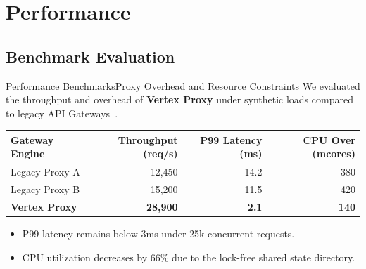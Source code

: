 \section{Performance}
\subsection{Benchmark Evaluation}

\begin{frame}{Performance Benchmarks}{Proxy Overhead and Resource Constraints}
  We evaluated the throughput and overhead of \textbf{Vertex Proxy} under synthetic loads compared to legacy API Gateways~\cite{jenkins2025synapse}.
  
  \vspace{0.3cm}
  \centering
  \begin{tabular}{lrrr}
    \toprule
    \textbf{Gateway Engine} & \textbf{Throughput (req/s)} & \textbf{P99 Latency (ms)} & \textbf{CPU Over (mcores)} \\
    \midrule
    Legacy Proxy A          & 12,450                      & 14.2                      & 380                        \\
    Legacy Proxy B          & 15,200                      & 11.5                      & 420                        \\
    \textbf{Vertex Proxy}   & \textbf{28,900}             & \textbf{2.1}              & \textbf{140}               \\
    \bottomrule
  \end{tabular}
  
  \vspace{0.4cm}
  \begin{itemize}
    \item P99 latency remains below 3ms under 25k concurrent requests.
    \item CPU utilization decreases by 66\% due to the lock-free shared state directory.
  \end{itemize}
\end{frame}
